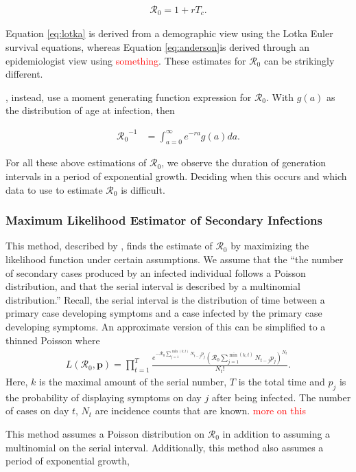 \documentclass[12pt]{article}
\newcommand{\com}[1]{\textcolor{red}{ #1}}
\newcommand{\rr}{\ensuremath{\mathcal{R}_0}}
\begin{document}
\begin{align}\label{eq:anderson}
\rr = 1 + rT_c.
\end{align}


Equation \eqref{eq:lotka} is derived from a demographic view using the Lotka Euler survival equations, whereas Equation \eqref{eq:anderson}is derived through an epidemiologist view using \com{something}.  These estimates for $\rr$ can be strikingly different.

\cite{wallinga2007generation}, instead, use a moment generating function expression for $\rr$.  With $g(a)$ as the distribution of age at infection, then

\begin{align*}
\rr^{-1} &= \int_{a=0}^\infty e^{-ra}g(a)da.
\end{align*}

For all these above estimations of $\rr$, we observe the duration of generation intervals in a period of exponential growth.  Deciding when this occurs and which data to use to estimate $\rr$ is difficult.

\subsubsection{Maximum Likelihood Estimator of Secondary Infections}\label{sec:mle-si}
This method, described by \cite{forsberg2008}, finds the estimate of $\rr$ by maximizing the likelihood function under certain assumptions.  We assume that the ``the number of secondary cases produced by an infected individual follows a Poisson distribution, and that the serial interval is described by a multinomial distribution.''  Recall, the serial interval is the distribution of time between a primary case developing symptoms and a case infected by the primary case developing symptoms.  An approximate version of this can be simplified to a thinned Poisson where
\begin{align*}
  L(\rr, \mathbf{p}) = \prod_{t=1}^T \frac{e^{- \rr \sum_{j=1}^{\min(k,t)}N_{t-j}p_j}\left (\rr \sum_{j=1}^{\min(k,t)}N_{t-j}p_j \right )^{N_t}}{N_t!}.
\end{align*}
Here, $k$ is the maximal amount of the serial number, $T$ is the total time and $p_j$ is the probability of displaying symptoms on day $j$ after being infected.  The number of cases on day $t$, $N_t$ are incidence counts that are known. \com{more on this}

This method assumes a Poisson distribution on $\rr$ in addition to assuming a multinomial on the serial interval.  Additionally, this method also assumes a period of exponential growth,
\end{document}
